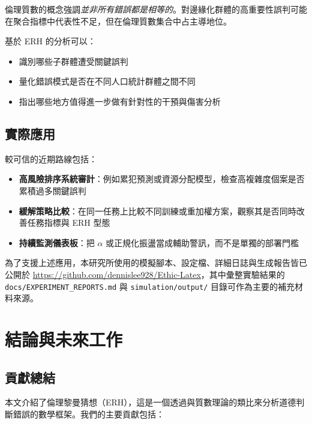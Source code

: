 \documentclass[12pt,a4paper]{article}
\theoremstyle{definition}
\theoremstyle{remark}
\begin{document}
倫理質數的概念強調\emph{並非所有錯誤都是相等的}。對邊緣化群體的高重要性誤判可能在聚合指標中代表性不足，但在倫理質數集合中占主導地位。

基於 ERH 的分析可以：
\begin{itemize}
    \item 識別哪些子群體遭受關鍵誤判
    \item 量化錯誤模式是否在不同人口統計群體之間不同
    \item 指出哪些地方值得進一步做有針對性的干預與傷害分析
\end{itemize}

\subsection{實際應用}

較可信的近期路線包括：
\begin{itemize}
    \item \textbf{高風險排序系統審計}：例如累犯預測或資源分配模型，檢查高複雜度個案是否累積過多關鍵誤判
    \item \textbf{緩解策略比較}：在同一任務上比較不同訓練或重加權方案，觀察其是否同時改善任務指標與 ERH 型態
    \item \textbf{持續監測儀表板}：把 $\alpha$ 或正規化振盪當成輔助警訊，而不是單獨的部署門檻
\end{itemize}

為了支援上述應用，本研究所使用的模擬腳本、設定檔、詳細日誌與生成報告皆已公開於 \url{https://github.com/dennislee928/Ethic-Latex}，其中彙整實驗結果的 \texttt{docs/EXPERIMENT\_REPORTS.md} 與 \texttt{simulation/output/} 目錄可作為主要的補充材料來源。

\section{結論與未來工作}
\label{sec:conclusion}

\subsection{貢獻總結}

本文介紹了倫理黎曼猜想（ERH），這是一個透過與質數理論的類比來分析道德判斷錯誤的數學框架。我們的主要貢獻包括：
\end{document}
